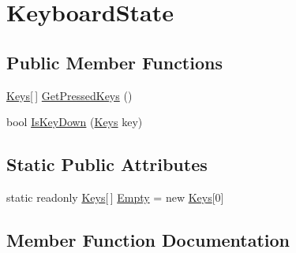 \hypertarget{structMicrosoft_1_1Xna_1_1Framework_1_1Input_1_1KeyboardState}{}\section{Keyboard\+State}
\label{structMicrosoft_1_1Xna_1_1Framework_1_1Input_1_1KeyboardState}
\subsection*{Public Member Functions}
\begin{DoxyCompactItemize}
\item 
\hyperlink{namespaceMicrosoft_1_1Xna_1_1Framework_1_1Input_a0ada92b8263d776ca3c779d2a0e031bc}{Keys}\mbox{[}$\,$\mbox{]} \hyperlink{structMicrosoft_1_1Xna_1_1Framework_1_1Input_1_1KeyboardState_a61e04584dcf79d14d041478f1787ac36}{Get\+Pressed\+Keys} ()
\item 
bool \hyperlink{structMicrosoft_1_1Xna_1_1Framework_1_1Input_1_1KeyboardState_acfc4889ac20c85eaff2ceb45d7194661}{Is\+Key\+Down} (\hyperlink{namespaceMicrosoft_1_1Xna_1_1Framework_1_1Input_a0ada92b8263d776ca3c779d2a0e031bc}{Keys} key)
\end{DoxyCompactItemize}
\subsection*{Static Public Attributes}
\begin{DoxyCompactItemize}
\item 
static readonly \hyperlink{namespaceMicrosoft_1_1Xna_1_1Framework_1_1Input_a0ada92b8263d776ca3c779d2a0e031bc}{Keys}\mbox{[}$\,$\mbox{]} \hyperlink{structMicrosoft_1_1Xna_1_1Framework_1_1Input_1_1KeyboardState_aae90a93838446a1d53c02abe085e34d4}{Empty} = new \hyperlink{namespaceMicrosoft_1_1Xna_1_1Framework_1_1Input_a0ada92b8263d776ca3c779d2a0e031bc}{Keys}\mbox{[}0\mbox{]}
\end{DoxyCompactItemize}


\subsection{Member Function Documentation}
\hypertarget{structMicrosoft_1_1Xna_1_1Framework_1_1Input_1_1KeyboardState_a61e04584dcf79d14d041478f1787ac36}{}
